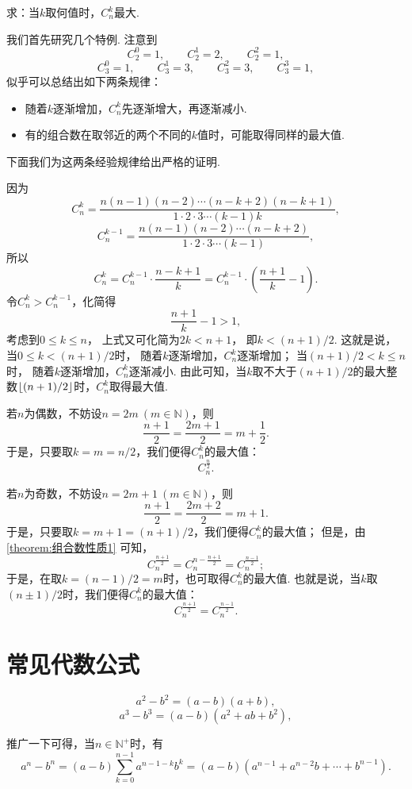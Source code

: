 \begin{example}
求：当\(k\)取何值时，\(C_n^k\)最大.
\begin{solution}
我们首先研究几个特例.
注意到\[
	C_2^0 = 1, \qquad
	C_2^1 = 2, \qquad
	C_2^2 = 1,
\]\[
	C_3^0 = 1, \qquad
	C_3^1 = 3, \qquad
	C_3^2 = 3, \qquad
	C_3^3 = 1,
\]
似乎可以总结出如下两条规律：
\begin{itemize}
	\item 随着\(k\)逐渐增加，\(C_n^k\)先逐渐增大，再逐渐减小.
	\item 有的组合数在取邻近的两个不同的\(k\)值时，可能取得同样的最大值.
\end{itemize}
下面我们为这两条经验规律给出严格的证明.

因为\[
	C_n^k = \frac{n(n-1)(n-2)\dotsm(n-k+2)(n-k+1)}{1\cdot2\cdot3\dotsm(k-1)k},
\]\[
	C_n^{k-1} = \frac{n(n-1)(n-2)\dotsm(n-k+2)}{1\cdot2\cdot3\dotsm(k-1)},
\]
所以\[
	C_n^k = C_n^{k-1} \cdot \frac{n-k+1}{k}
	= C_n^{k-1} \cdot \left( \frac{n+1}{k} - 1 \right).
\]
令\(C_n^k > C_n^{k-1}\)，化简得\[
	\frac{n+1}{k} - 1 > 1,
\]
考虑到\(0 \leqslant k \leqslant n\)，
上式又可化简为\(2k < n+1\)，
即\(k < (n+1)/2\).
这就是说，当\(0 \leqslant k < (n+1)/2\)时，
随着\(k\)逐渐增加，\(C_n^k\)逐渐增加；
当\((n+1)/2 < k \leqslant n\)时，
随着\(k\)逐渐增加，\(C_n^k\)逐渐减小.
由此可知，当\(k\)取不大于\((n+1)/2\)的最大整数\(\lfloor(n+1)/2\rfloor\)时，\(C_n^k\)取得最大值.

若\(n\)为偶数，不妨设\(n = 2m\ (m\in\mathbb{N})\)，则\[
	\frac{n+1}{2} = \frac{2m+1}{2}
	= m+\frac{1}{2}.
\]
于是，只要取\(k = m = n/2\)，我们便得\(C_n^k\)的最大值：\[
	C_n^{\frac{n}{2}}.
\]

若\(n\)为奇数，不妨设\(n = 2m+1\ (m\in\mathbb{N})\)，则\[
	\frac{n+1}{2} = \frac{2m+2}{2} = m+1.
\]
于是，只要取\(k = m+1 = (n+1)/2\)，我们便得\(C_n^k\)的最大值；
但是，由\cref{theorem:组合数性质1} 可知，\[
	C_n^{\frac{n+1}{2}}
	= C_n^{n-\frac{n+1}{2}}
	= C_n^{\frac{n-1}{2}};
\]
于是，在取\(k = (n-1)/2 = m\)时，也可取得\(C_n^k\)的最大值.
也就是说，当\(k\)取\((n\pm1)/2\)时，我们便得\(C_n^k\)的最大值：\[
	C_n^{\frac{n+1}{2}}
	= C_n^{\frac{n-1}{2}}.
\]
\end{solution}
\end{example}

\section{常见代数公式}

\begin{theorem}
\[
a^2 - b^2 = (a-b)(a+b),
\]\[
a^3 - b^3 = (a-b)(a^2+ab+b^2),
\]

推广一下可得，当\(n \in \mathbb{N}^+\)时，有\[
a^n - b^n = (a-b) \sum\limits_{k=0}^{n-1}{a^{n-1-k} b^k}
= (a-b)(a^{n-1} + a^{n-2} b + \dotsb + b^{n-1}).
\]
\end{theorem}

